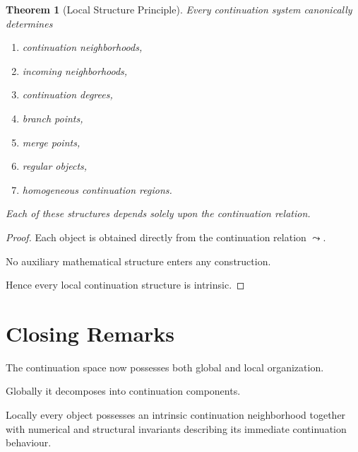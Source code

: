 \documentclass[13pt,openany]{book}
\theoremstyle{plain}
\newtheorem{theorem}{Theorem}[chapter]
\theoremstyle{definition}
\begin{document}
\begin{theorem}[Local Structure Principle]

Every continuation system canonically determines

\begin{enumerate}

\item continuation neighborhoods,

\item incoming neighborhoods,

\item continuation degrees,

\item branch points,

\item merge points,

\item regular objects,

\item homogeneous continuation regions.

\end{enumerate}

Each of these structures depends solely upon the continuation relation.

\end{theorem}

\begin{proof}

Each object is obtained directly from the continuation relation
\(
\leadsto
\).

No auxiliary mathematical structure enters any construction.

Hence every local continuation structure is intrinsic.

\end{proof}


\section*{Closing Remarks}

The continuation space now possesses both global and local organization.

Globally it decomposes into continuation components.

Locally every object possesses an intrinsic continuation neighborhood together
with numerical and structural invariants describing its immediate continuation
behaviour.
\end{document}
